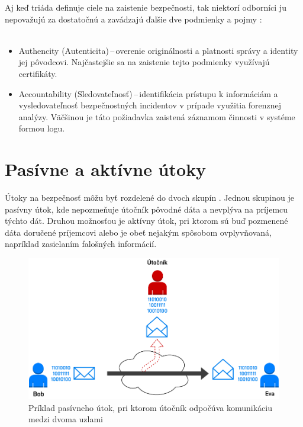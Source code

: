 	\noindent
	Aj keď triáda  definuje ciele na zaistenie bezpečnosti, tak niektorí odborníci ju nepovažujú za dostatočnú a zavádzajú ďalšie dve podmienky a pojmy  \cite{Stallings2011}:\\
	\\
	\begin{itemize}
		\item Authencity (Autenticita)\,--\,overenie originálnosti a platnosti správy a identity jej pôvodcovi. Najčastejšie sa na zaistenie tejto podmienky využívajú certifikáty.
		\item Accountability (Sledovateľnosť)\,--\,identifikácia prístupu k informáciám a vysledovateľnosť bezpečnostných incidentov v prípade využitia forenznej analýzy. Väčšinou je táto požiadavka zaistená záznamom činnosti v systéme formou logu.
	\end{itemize}





\newpage
\section{Pasívne a aktívne útoky}
Útoky na bezpečnosť môžu byť rozdelené do dvoch skupín \cite{Vyncke2008}. Jednou skupinou je pasívny útok, kde nepozmeňuje útočník pôvodné dáta a nevplýva na príjemcu týchto dát. Druhou možnosťou je aktívny útok, pri ktorom sú buď pozmenené dáta doručené príjemcovi alebo je obeť nejakým spôsobom ovplyvňovaná, napríklad zasielaním falošných informácií.

\begin{figure}[H]
	\begin{center}
		\includegraphics[scale=0.55]{obrazky/passive-attack.pdf}
	\end{center}
	\caption[Pasívny útok]{Príklad pasívneho útok, pri ktorom útočník odpočúva komunikáciu medzi dvoma uzlami \cite{Stallings2011}}
	\label{passive-attack}
\end{figure}

